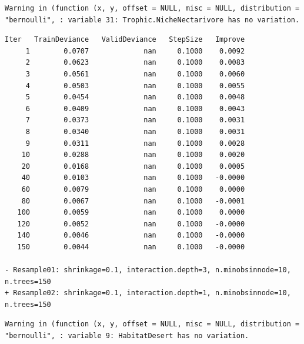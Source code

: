 \documentclass[
  letterpaper,
  DIV=11,
  numbers=noendperiod]{scrartcl}
\begin{document}
\begin{verbatim}
Warning in (function (x, y, offset = NULL, misc = NULL, distribution =
"bernoulli", : variable 31: Trophic.NicheNectarivore has no variation.
\end{verbatim}

\begin{verbatim}
Iter   TrainDeviance   ValidDeviance   StepSize   Improve
     1        0.0707             nan     0.1000    0.0092
     2        0.0623             nan     0.1000    0.0083
     3        0.0561             nan     0.1000    0.0060
     4        0.0503             nan     0.1000    0.0055
     5        0.0454             nan     0.1000    0.0048
     6        0.0409             nan     0.1000    0.0043
     7        0.0373             nan     0.1000    0.0031
     8        0.0340             nan     0.1000    0.0031
     9        0.0311             nan     0.1000    0.0028
    10        0.0288             nan     0.1000    0.0020
    20        0.0168             nan     0.1000    0.0005
    40        0.0103             nan     0.1000   -0.0000
    60        0.0079             nan     0.1000    0.0000
    80        0.0067             nan     0.1000   -0.0001
   100        0.0059             nan     0.1000    0.0000
   120        0.0052             nan     0.1000   -0.0000
   140        0.0046             nan     0.1000   -0.0000
   150        0.0044             nan     0.1000   -0.0000

- Resample01: shrinkage=0.1, interaction.depth=3, n.minobsinnode=10, n.trees=150 
+ Resample02: shrinkage=0.1, interaction.depth=1, n.minobsinnode=10, n.trees=150 
\end{verbatim}

\begin{verbatim}
Warning in (function (x, y, offset = NULL, misc = NULL, distribution =
"bernoulli", : variable 9: HabitatDesert has no variation.
\end{verbatim}
\end{document}
